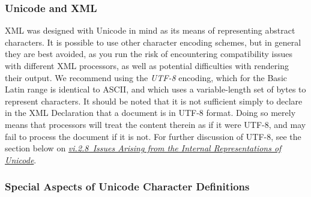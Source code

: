 \subsubsection[{Unicode and XML}]{Unicode and XML}\label{D4-45b}\par
XML was designed with Unicode in mind as its means of representing abstract characters. It is possible to use other character encoding schemes, but in general they are best avoided, as you run the risk of encountering compatibility issues with different XML processors, as well as potential difficulties with rendering their output. We recommend using the \textit{UTF-8} encoding, which for the Basic Latin range is identical to ASCII, and which uses a variable-length set of bytes to represent characters. It should be noted that it is not sufficient simply to declare in the XML Declaration that a document is in UTF-8 format. Doing so merely means that processors will treat the content therein as if it were UTF-8, and may fail to process the document if it is not. For further discussion of UTF-8, see the section below on \textit{\hyperref[D4-48]{vi.2.8\ Issues Arising from the Internal Representations of Unicode}}.
\subsubsection[{Special Aspects of Unicode Character Definitions}]{Special Aspects of Unicode Character Definitions}\label{D4-46}
